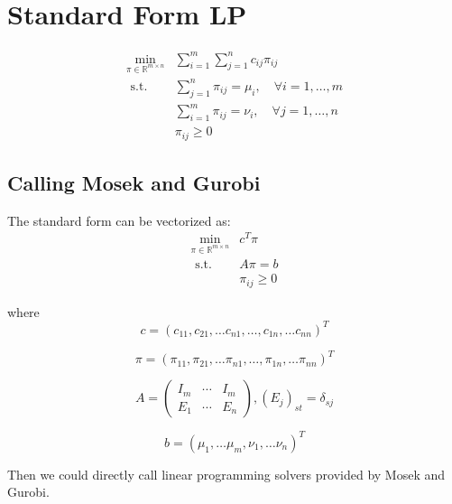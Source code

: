 
\clearpage
\section{Standard Form LP}
\begin{equation}
    \begin{aligned}
      \min _{\pi \in \mathbb{R}^{m \times n}} & \sum_{i=1}^{m} \sum_{j=1}^{n} c_{i j} \pi_{i j} \\
      \text { s.t. } & \sum_{j=1}^{n} \pi_{i j}=\mu_{i}, \quad \forall i=1, \ldots, m \\
      & \sum_{i=1}^{m} \pi_{i j}=\nu_{i}, \quad \forall j=1, \ldots, n \\
      & \pi_{i j} \geq 0
    \end{aligned}
  \end{equation}
  
  \vspace{5ex}

\subsection{Calling Mosek and Gurobi}

The standard form can be vectorized as:
\begin{equation}
    \begin{aligned}
      \min _{\pi \in \mathbb{R}^{m \times n}} & c^T \pi \\
      \text { s.t. } & A \pi = b \\
      & \pi_{i j} \geq 0
    \end{aligned}
  \end{equation}

where 
$$
c=\left(c_{11}, c_{21}, \dots c_{n 1}, \dots, c_{1 n}, \dots c_{n n}\right)^{T}
$$

$$
\pi=\left(\pi_{11}, \pi_{21}, \ldots \pi_{n 1}, \ldots, \pi_{1 n}, \ldots \pi_{n n}\right)^{T}
$$

$$
A=\left(\begin{array}{ccc}
    {I_{m}} & {\cdots} & {I_{m}} \\
    {E_{1}} & {\cdots} & {E_{n}}
    \end{array}\right),\left(E_{j}\right)_{s t}=\delta_{s j}
$$

$$
b=\left(\mu_{1}, \dots \mu_{m}, \nu_{1}, \dots \nu_{n}\right)^{T}
$$

Then we could directly call linear programming solvers provided by Mosek and Gurobi.

